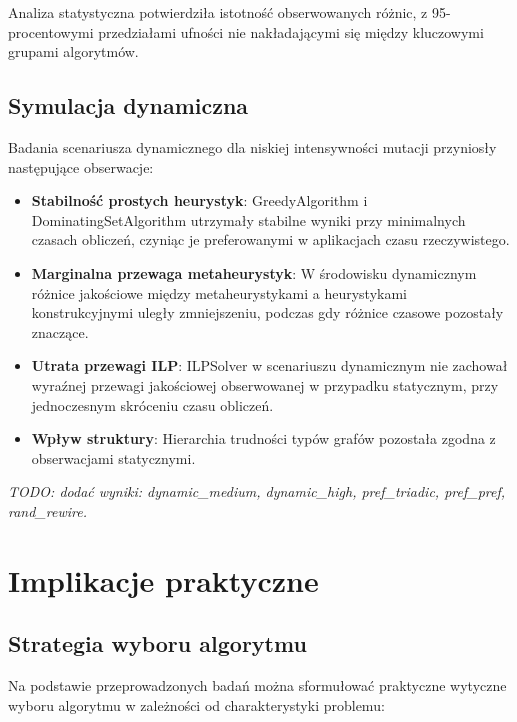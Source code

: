 Analiza statystyczna potwierdziła istotność obserwowanych różnic, z 95-procentowymi przedziałami ufności nie nakładającymi się między kluczowymi grupami algorytmów.

\subsection{Symulacja dynamiczna}

Badania scenariusza dynamicznego dla niskiej intensywności mutacji przyniosły następujące obserwacje:

\begin{itemize}
  \item \textbf{Stabilność prostych heurystyk}: GreedyAlgorithm i DominatingSetAlgorithm utrzymały stabilne wyniki przy minimalnych czasach obliczeń, czyniąc je preferowanymi w aplikacjach czasu rzeczywistego.

  \item \textbf{Marginalna przewaga metaheurystyk}: W środowisku dynamicznym różnice jakościowe między metaheurystykami a heurystykami konstrukcyjnymi uległy zmniejszeniu, podczas gdy różnice czasowe pozostały znaczące.

  \item \textbf{Utrata przewagi ILP}: ILPSolver w scenariuszu dynamicznym nie zachował wyraźnej przewagi jakościowej obserwowanej w przypadku statycznym, przy jednoczesnym skróceniu czasu obliczeń.

  \item \textbf{Wpływ struktury}: Hierarchia trudności typów grafów pozostała zgodna z obserwacjami statycznymi.
\end{itemize}

\emph{TODO: dodać wyniki: dynamic\_medium, dynamic\_high, pref\_triadic, pref\_pref, rand\_rewire.}

\section{Implikacje praktyczne}

\subsection{Strategia wyboru algorytmu}

Na podstawie przeprowadzonych badań można sformułować praktyczne wytyczne wyboru algorytmu w zależności od charakterystyki problemu:


